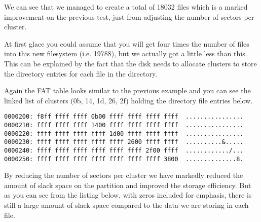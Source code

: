 \documentclass[a4paper,
    11pt,
    normalheadings,
    parindent,
    UKenglish,
    abstracton,
    ]{scrartcl}
\begin{document}
We can see that we managed to create a total of 18032 files which is a marked improvement on the previous test, just from adjusting the number of sectors per cluster. 

At first glace you could assume that you will get four times the number of files into this new filesystem (i.e. 19788), but we actually got a little less than this. This can be explained by the fact that the disk needs to allocate clusters to store the directory entries for each file in the directory.

Again the FAT table looks similar to the previous example and you can see the linked list of clusters (0b, 14, 1d, 26, 2f) holding the directory file entries below. 
\begin{verbatim}
0000200: f8ff ffff ffff 0b00 ffff ffff ffff ffff  ................
0000210: ffff ffff ffff 1400 ffff ffff ffff ffff  ................
0000220: ffff ffff ffff ffff 1d00 ffff ffff ffff  ................
0000230: ffff ffff ffff ffff ffff 2600 ffff ffff  ..........&.....
0000240: ffff ffff ffff ffff ffff ffff 2f00 ffff  ............/...
0000250: ffff ffff ffff ffff ffff ffff ffff 3800  ..............8.
\end{verbatim}

By reducing the number of sectors per cluster we have markedly reduced the amount of slack space on the partition and improved the storage efficiency. But as you can see from the listing below, with zeros included for emphasis, there is still a large amount of slack space compared to the data we are storing in each file.
\end{document}
